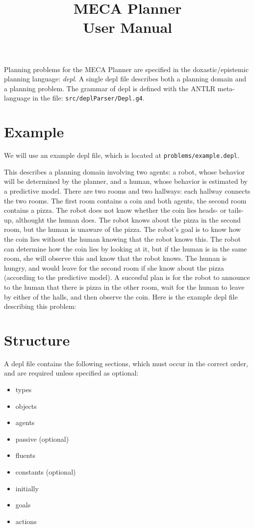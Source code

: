 \documentclass{article}
\title{MECA Planner  \\
\large User Manual
}
\begin{document}
\maketitle


Planning problems for the MECA Planner are specified in the doxastic/epistemic
planning language: \emph{depl}. A single depl file describes both a planning domain
and a planning problem.
The grammar of depl is defined with the ANTLR meta-language in the file:
\texttt{src/deplParser/Depl.g4}.


\section{Example}

We will use an example depl file, which is located at 
\texttt{problems/example.depl}.

This describes a planning domain involving two agents: a robot, whose behavior
will be determined by the planner, and a human, whose behavior is
estimated by a predictive model. There are two rooms and two hallways: each
hallway connects the two rooms. The first room contains a coin and both agents,
the second room contains a pizza. The robot does not know whether the coin lies
heads- or tails-up, althought the human does. The robot knows about the pizza in
the second room, but the human is unaware of the pizza.
The robot's goal is to know how the coin lies without the human knowing that the
robot knows this.
The robot can determine
how the coin lies by looking at it, but if the human is in the same room, she
will observe this and know that the robot knows. The human is hungry, and would
leave for the second room if she know about the pizza (according to the
predictive model).
A succesful plan is for the robot to announce to the human that there is pizza
in the other room, wait for the human to leave by either of the halls, and then
observe the coin. Here is the example depl file describing this problem:





\section{Structure}

A depl file contains the following sections, which must occur in the correct
order, and are required unless specified as optional:

\begin{itemize}
\item types
\item objects
\item agents
\item passive (optional)
\item fluents
\item constants (optional)
\item initially
\item goals
\item actions
\end{itemize}
\end{document}
